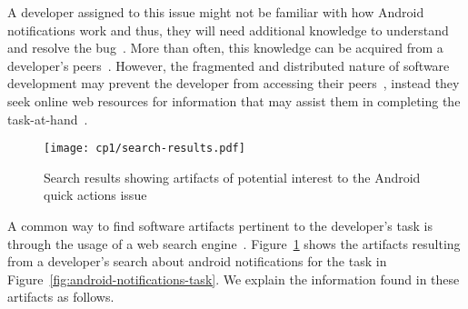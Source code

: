  
 \medskip
 A developer assigned to this issue might not be familiar with how Android notifications work and thus, they will need additional knowledge to understand and resolve the bug~\cite{ko2007, Li2013, sillito2006}. 
 More than often, this knowledge can be acquired from a developer's peers~\cite{singer2011}. 
 However, the fragmented and distributed nature of software development  
 may prevent the developer from accessing their peers~\cite{ko2007},
 instead they seek online web resources for information 
 that may assist them in completing the task-at-hand~\cite{Xia2017, rao2020}.
 
 
 
 
 
 \begin{figure}
     \centering
     \texttt{[image: cp1/search-results.pdf]}
     \caption{Search results showing artifacts of potential interest to the Android quick actions issue}
     \label{fig:android-search-results}
 \end{figure}
 
 
 
A common way to find software artifacts
pertinent to the developer's task
is through the usage of a web search engine~\cite{Brandt2009a, Li2013}.
Figure~\ref{fig:android-search-results}
shows the artifacts resulting from a developer's search 
about android notifications for the task in Figure~\ref{fig:android-notifications-task}.
We explain the information found in these artifacts as follows.




